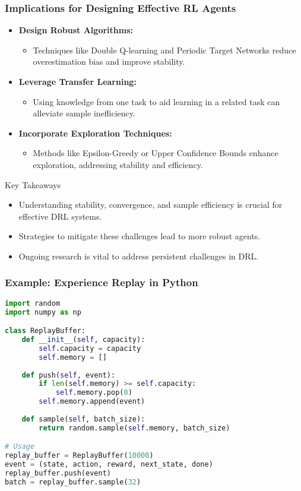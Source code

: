\documentclass[aspectratio=169]{beamer}
\begin{document}
\begin{frame}
    \frametitle{Implications for Designing Effective RL Agents}
    \begin{itemize}
        \item \textbf{Design Robust Algorithms:}
        \begin{itemize}
            \item Techniques like Double Q-learning and Periodic Target Networks reduce overestimation bias and improve stability.
        \end{itemize}

        \item \textbf{Leverage Transfer Learning:}
        \begin{itemize}
            \item Using knowledge from one task to aid learning in a related task can alleviate sample inefficiency.
        \end{itemize}

        \item \textbf{Incorporate Exploration Techniques:}
        \begin{itemize}
            \item Methods like Epsilon-Greedy or Upper Confidence Bounds enhance exploration, addressing stability and efficiency.
        \end{itemize}
    \end{itemize}

    \begin{block}{Key Takeaways}
        \begin{itemize}
            \item Understanding stability, convergence, and sample efficiency is crucial for effective DRL systems.
            \item Strategies to mitigate these challenges lead to more robust agents.
            \item Ongoing research is vital to address persistent challenges in DRL.
        \end{itemize}
    \end{block}
\end{frame}

\begin{frame}[fragile]
    \frametitle{Example: Experience Replay in Python}
    \begin{lstlisting}[language=Python]
import random
import numpy as np

class ReplayBuffer:
    def __init__(self, capacity):
        self.capacity = capacity
        self.memory = []
    
    def push(self, event):
        if len(self.memory) >= self.capacity:
            self.memory.pop(0)
        self.memory.append(event)
    
    def sample(self, batch_size):
        return random.sample(self.memory, batch_size)

# Usage
replay_buffer = ReplayBuffer(10000)
event = (state, action, reward, next_state, done)
replay_buffer.push(event)
batch = replay_buffer.sample(32)
    \end{lstlisting}
\end{frame}
\end{document}
